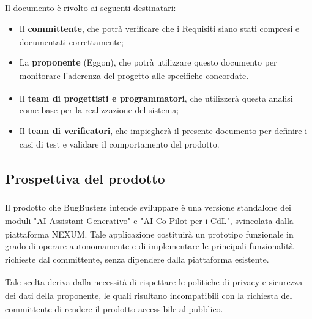 ﻿\documentclass[a4paper,11pt]{article}
\begin{document}
Il documento è rivolto ai seguenti destinatari:
\begin{itemize}
    \item Il \textbf{committente\textsubscript{}}, che potrà verifica\textsubscript{}re che i Requisiti siano stati compresi e documentati correttamente;
    \item La \textbf{proponente\textsubscript{}} (Eggon), che potrà utilizzare questo documento per monitorare l'aderenza del progetto\textsubscript{} alle specifiche concordate.
    \item Il \textbf{team di progettisti e programmatori}, che utilizzerà questa analisi come base per la realizzazione del sistema;
    \item Il \textbf{team di verifica\textsubscript{}tori}, che impiegherà il presente documento per definire i casi di test\textsubscript{} e validare il comportamento del prodotto\textsubscript{}.
\end{itemize}

\newpage

\subsection{Prospettiva del prodotto\textsubscript{}}

Il prodotto\textsubscript{} che BugBusters intende sviluppare è una versione standalone dei moduli "AI Assistant\textsubscript{} Generativo" e "AI Co-Pilot\textsubscript{} per i CdL\textsubscript{}", svincolata dalla piattaforma NEXUM. Tale applicazione costituirà un prototipo funzionale in grado di operare autonomamente e di implementare le principali funzionalità\textsubscript{} richieste dal committente\textsubscript{}, senza dipendere dalla piattaforma esistente.

Tale scelta deriva dalla necessità di rispettare le politiche di privacy e sicurezza\textsubscript{} dei dati della proponente\textsubscript{}, le quali risultano incompatibili con la richiesta del committente\textsubscript{} di rendere il prodotto\textsubscript{} accessibile al pubblico.
\end{document}
